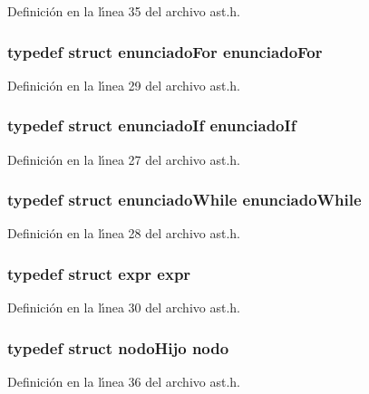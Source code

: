 Definici\'{o}n en la l\'{\i}nea 35 del archivo ast.h.
\subsubsection{\setlength{\rightskip}{0pt plus 5cm}typedef struct {\bf enunciado\-For} {\bf enunciado\-For}}\label{ast_8h_a7}




Definici\'{o}n en la l\'{\i}nea 29 del archivo ast.h.
\subsubsection{\setlength{\rightskip}{0pt plus 5cm}typedef struct {\bf enunciado\-If} {\bf enunciado\-If}}\label{ast_8h_a5}




Definici\'{o}n en la l\'{\i}nea 27 del archivo ast.h.
\subsubsection{\setlength{\rightskip}{0pt plus 5cm}typedef struct {\bf enunciado\-While} {\bf enunciado\-While}}\label{ast_8h_a6}




Definici\'{o}n en la l\'{\i}nea 28 del archivo ast.h.
\subsubsection{\setlength{\rightskip}{0pt plus 5cm}typedef struct {\bf expr} {\bf expr}}\label{ast_8h_a8}




Definici\'{o}n en la l\'{\i}nea 30 del archivo ast.h.
\subsubsection{\setlength{\rightskip}{0pt plus 5cm}typedef struct {\bf nodo\-Hijo} {\bf nodo}}\label{ast_8h_a14}




Definici\'{o}n en la l\'{\i}nea 36 del archivo ast.h.
